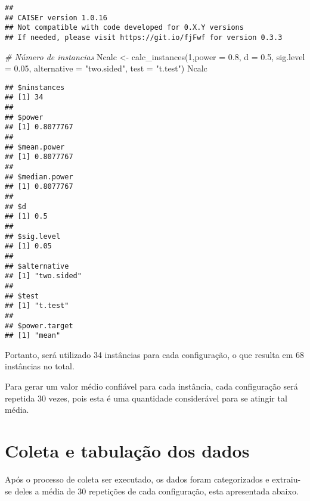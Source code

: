\documentclass[
]{article}
\newenvironment{Shaded}{\begin{snugshade}}{\end{snugshade}}
\newcommand{\AttributeTok}[1]{\textcolor[rgb]{0.77,0.63,0.00}{#1}}
\newcommand{\CommentTok}[1]{\textcolor[rgb]{0.56,0.35,0.01}{\textit{#1}}}
\newcommand{\DecValTok}[1]{\textcolor[rgb]{0.00,0.00,0.81}{#1}}
\newcommand{\FloatTok}[1]{\textcolor[rgb]{0.00,0.00,0.81}{#1}}
\newcommand{\FunctionTok}[1]{\textcolor[rgb]{0.00,0.00,0.00}{#1}}
\newcommand{\NormalTok}[1]{#1}
\newcommand{\OtherTok}[1]{\textcolor[rgb]{0.56,0.35,0.01}{#1}}
\newcommand{\StringTok}[1]{\textcolor[rgb]{0.31,0.60,0.02}{#1}}
\begin{document}
\begin{verbatim}
## 
## CAISEr version 1.0.16
## Not compatible with code developed for 0.X.Y versions
## If needed, please visit https://git.io/fjFwf for version 0.3.3
\end{verbatim}

\begin{Shaded}
\begin{Highlighting}[]
\CommentTok{\# Número de instancias}
\NormalTok{Ncalc }\OtherTok{\textless{}{-}} \FunctionTok{calc\_instances}\NormalTok{(}\DecValTok{1}\NormalTok{,}\AttributeTok{power =} \FloatTok{0.8}\NormalTok{, }\AttributeTok{d =} \FloatTok{0.5}\NormalTok{, }\AttributeTok{sig.level =} \FloatTok{0.05}\NormalTok{, }\AttributeTok{alternative =} \StringTok{"two.sided"}\NormalTok{, }\AttributeTok{test =} \StringTok{"t.test"}\NormalTok{)}
\NormalTok{Ncalc}
\end{Highlighting}
\end{Shaded}

\begin{verbatim}
## $ninstances
## [1] 34
## 
## $power
## [1] 0.8077767
## 
## $mean.power
## [1] 0.8077767
## 
## $median.power
## [1] 0.8077767
## 
## $d
## [1] 0.5
## 
## $sig.level
## [1] 0.05
## 
## $alternative
## [1] "two.sided"
## 
## $test
## [1] "t.test"
## 
## $power.target
## [1] "mean"
\end{verbatim}

Portanto, será utilizado 34 instâncias para cada configuração, o que
resulta em 68 instâncias no total.

Para gerar um valor médio confiável para cada instância, cada
configuração será repetida 30 vezes, pois esta é uma quantidade
considerável para se atingir tal média.

\hypertarget{coleta-e-tabulauxe7uxe3o-dos-dados}{%
\section{Coleta e tabulação dos
dados}\label{coleta-e-tabulauxe7uxe3o-dos-dados}}

Após o processo de coleta ser executado, os dados foram categorizados e
extraiu-se deles a média de 30 repetições de cada configuração, esta
apresentada abaixo.
\end{document}
